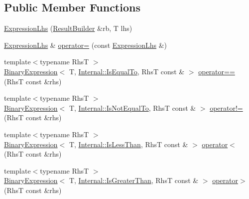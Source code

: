\subsection*{Public Member Functions}
\begin{DoxyCompactItemize}
\item 
\mbox{\hyperlink{class_catch_1_1_expression_lhs_aa829588def6146a94fb75de9c4cc482a}{Expression\+Lhs}} (\mbox{\hyperlink{class_catch_1_1_result_builder}{Result\+Builder}} \&rb, T lhs)
\item 
\mbox{\hyperlink{class_catch_1_1_expression_lhs}{Expression\+Lhs}} \& \mbox{\hyperlink{class_catch_1_1_expression_lhs_a60d50fe8adcaabcb7c93747ddbae5993}{operator=}} (const \mbox{\hyperlink{class_catch_1_1_expression_lhs}{Expression\+Lhs}} \&)
\item 
{\footnotesize template$<$typename RhsT $>$ }\\\mbox{\hyperlink{class_catch_1_1_binary_expression}{Binary\+Expression}}$<$ T, \mbox{\hyperlink{namespace_catch_1_1_internal_ae3f96598a7858155750bf38e7295d83ea30e0accba6ec8384f4383b04dd2a6a9e}{Internal\+::\+Is\+Equal\+To}}, RhsT const  \& $>$ \mbox{\hyperlink{class_catch_1_1_expression_lhs_abebe4afc079c91ae548ab8fdba6c77f2}{operator==}} (RhsT const \&rhs)
\item 
{\footnotesize template$<$typename RhsT $>$ }\\\mbox{\hyperlink{class_catch_1_1_binary_expression}{Binary\+Expression}}$<$ T, \mbox{\hyperlink{namespace_catch_1_1_internal_ae3f96598a7858155750bf38e7295d83ea1e1699cf7d3dbee0908f1a123da2456d}{Internal\+::\+Is\+Not\+Equal\+To}}, RhsT const  \& $>$ \mbox{\hyperlink{class_catch_1_1_expression_lhs_a3bc08bb2b9c27678e2628faa73645144}{operator!=}} (RhsT const \&rhs)
\item 
{\footnotesize template$<$typename RhsT $>$ }\\\mbox{\hyperlink{class_catch_1_1_binary_expression}{Binary\+Expression}}$<$ T, \mbox{\hyperlink{namespace_catch_1_1_internal_ae3f96598a7858155750bf38e7295d83eabbbfc41706595e50acbefa8408004b93}{Internal\+::\+Is\+Less\+Than}}, RhsT const  \& $>$ \mbox{\hyperlink{class_catch_1_1_expression_lhs_a919c48e52ff1be5f7329920d4da8e92f}{operator$<$}} (RhsT const \&rhs)
\item 
{\footnotesize template$<$typename RhsT $>$ }\\\mbox{\hyperlink{class_catch_1_1_binary_expression}{Binary\+Expression}}$<$ T, \mbox{\hyperlink{namespace_catch_1_1_internal_ae3f96598a7858155750bf38e7295d83eac0e8866139e99803d169595af70f6c22}{Internal\+::\+Is\+Greater\+Than}}, RhsT const  \& $>$ \mbox{\hyperlink{class_catch_1_1_expression_lhs_a52981d92ec6aad872660ae7df1abb33a}{operator$>$}} (RhsT const \&rhs)

\end{DoxyCompactItemize}
